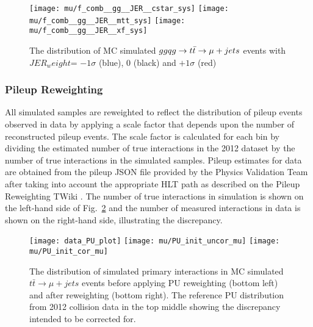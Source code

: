 \documentclass{cmspaperpdf}
\begin{document}
\begin{figure}[hbt]
  \begin{center}
    \texttt{[image: mu/f\_comb\_\_gg\_\_JER\_\_cstar\_sys]}
    \texttt{[image: mu/f\_comb\_\_gg\_\_JER\_\_mtt\_sys]}
    \texttt{[image: mu/f\_comb\_\_gg\_\_JER\_\_xf\_sys]}

  \caption{\small The distribution of MC simulated $gg\/qg\rightarrow t\bar{t}\rightarrow \mu+jets$ events with $JER_weight$= $-1\sigma$ (blue), 0 (black) and $+1\sigma$ (red)}
    \label{fig:gg_JER_templates}
  \end{center}
\end{figure}



\subsubsection{Pileup Reweighting}

All simulated samples are reweighted to reflect the distribution of pileup events observed in data by applying a scale factor that depends upon the number of reconstructed pileup events. The scale factor is calculated for each bin by dividing the estimated number of true interactions in the 2012 dataset by the number of true interactions in the simulated samples. Pileup estimates for data are obtained from the pileup JSON file provided by the Physics Validation Team after taking into account the appropriate HLT path as described on the Pileup Reweighting TWiki \cite{pileup_reweighting_twiki}. The number of true interactions in simulation is shown on the left-hand side of Fig.~\ref{fig:MC_and_data_pileup} and the number of measured interactions in data is shown on the right-hand side, illustrating the discrepancy.

\begin{figure}[hbt]
  \begin{center}
    \texttt{[image: data\_PU\_plot]}  
    \texttt{[image: mu/PU\_init\_uncor\_mu]}
    \texttt{[image: mu/PU\_init\_cor\_mu]}
  \caption{\small The distribution of simulated primary interactions in MC simulated $t\bar{t}\rightarrow \mu +jets$ events before applying PU reweighting (bottom left) and after reweighting (bottom right). The reference PU distribution from 2012 collision data in the top middle showing the discrepancy intended to be corrected for. }
    \label{fig:MC_and_data_pileup}
  \end{center}
\end{figure}
\end{document}
